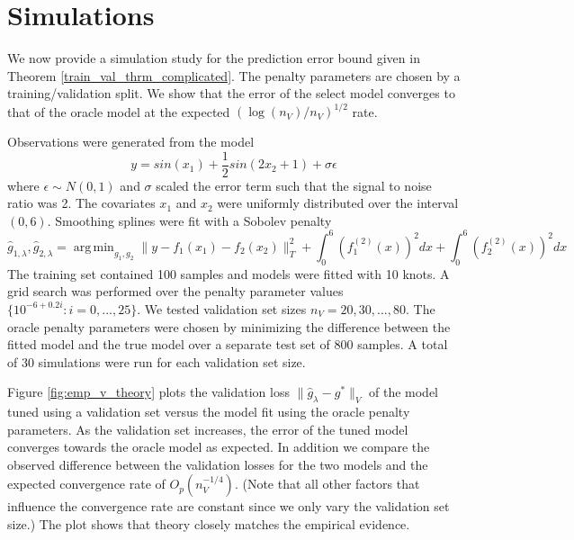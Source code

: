 \documentclass[12pt]{article}
\DeclareMathOperator*{\argmin}{arg\,min}
\begin{document}
\section{Simulations}\label{sec:simulations}

We now provide a simulation study for the prediction error bound given in Theorem \ref{train_val_thrm_complicated}. The penalty parameters are chosen by a training/validation split. We show that the error of the select model converges to that of the oracle model at the expected $(\log(n_V)/n_V)^{1/2}$ rate.

Observations were generated from the model
\begin{equation}
y = sin(x_1) + \frac{1}{2} sin(2 x_2 + 1) + \sigma \epsilon
\end{equation}
where $\epsilon \sim N(0,1)$ and $\sigma$ scaled the error term such that the signal to noise ratio was 2.
The covariates $x_1$ and $x_2$ were uniformly distributed over the interval $(0,6)$.
Smoothing splines were fit with a Sobolev penalty
\begin{equation}
\hat{g}_{1, \lambda}, \hat{g}_{2, \lambda} = \argmin_{g_1, g_2} \| y - f_1(x_1) - f_2(x_2) \|_T^2 + \int_0^6 (f_1^{(2)}(x))^2 dx + \int_0^6 (f_2^{(2)}(x))^2 dx
\end{equation}
The training set contained 100 samples and models were fitted with 10 knots. A grid search was performed over the penalty parameter values $\{10^{-6 + 0.2i}: i = 0, ..., 25 \}$. We tested validation set sizes $n_V = 20, 30, ..., 80$. The oracle penalty parameters were chosen by minimizing the difference between the fitted model and the true model over a separate test set of 800 samples. A total of 30 simulations were run for each validation set size.

Figure \ref{fig:emp_v_theory} plots the validation loss $\| \hat{g}_{\lambda} - g^* \|_V$ of the model tuned using a validation set versus the model fit using the oracle penalty parameters. As the validation set increases, the error of the tuned model converges towards the oracle model as expected. In addition we compare the observed difference between the validation losses for the two models and the expected convergence rate of $O_p\left (n_{V}^{-1/4} \right)$. (Note that all other factors that influence the convergence rate are constant since we only vary the validation set size.) The plot shows that theory closely matches the empirical evidence.
\end{document}
